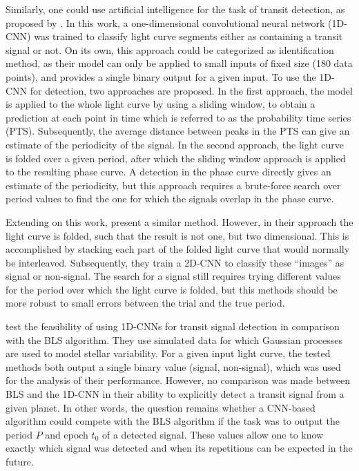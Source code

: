 Similarly, one could use artificial intelligence for the task of transit detection, as proposed by \cite{pearson2018searching}. In this work, a one-dimensional convolutional neural network (1D-CNN) was trained to classify light curve segments either as containing a transit signal or not. On its own, this approach could be categorized as identification method, as their model can only be applied to small inputs of fixed size (180 data points), and provides a single binary output for a given input. To use the 1D-CNN for detection, two approaches are proposed. In the first approach, the model is applied to the whole light curve by using a sliding window, to obtain a prediction at each point in time which is referred to as the probability time series (PTS). Subsequently, the average distance between peaks in the PTS can give an estimate of the periodicity of the signal. In the second approach, the light curve is folded over a given period, after which the sliding window approach is applied to the resulting phase curve. A detection in the phase curve directly gives an estimate of the periodicity, but this approach requires a brute-force search over period values to find the one for which the signals overlap in the phase curve.

Extending on this work, \cite{chintarungruangchai2019detecting} present a similar method. However, in their approach the light curve is folded, such that the result is not one, but two dimensional. This is accomplished by stacking each part of the folded light curve that would normally be interleaved. Subsequently, they train a 2D-CNN to classify these ``images'' as signal or non-signal. The search for a signal still requires trying different values for the period over which the light curve is folded, but this methods should be more robust to small errors between the trial and the true period.

\cite{zucker2018shallow} test the feasibility of using 1D-CNNs for transit signal detection in comparison with the BLS algorithm. They use simulated data for which Gaussian processes are used to model stellar variability. For a given input light curve, the tested methods both output a single binary value (signal, non-signal), which was used for the analysis of their performance. However, no comparison was made between BLS and the 1D-CNN in their ability to explicitly detect a transit signal from a given planet. In other words, the question remains whether a CNN-based algorithm could compete with the BLS algorithm if the task was to output the period $P$ and epoch $t_0$ of a detected signal. These values allow one to know exactly which signal was detected and when its repetitions can be expected in the future.


